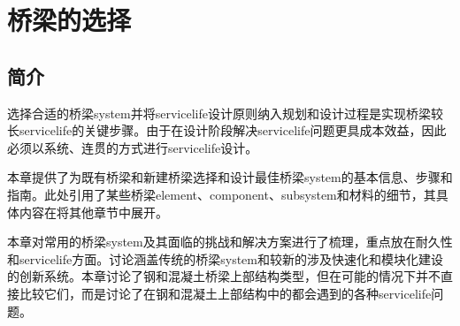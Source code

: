 \chapter{桥梁的选择}
\label{chp:bridge-system-selection}
\section{简介}
选择合适的桥梁\gls*{system}并将\gls*{servicelife}设计原则纳入规划和设计过程是实现桥梁较长\gls*{servicelife}的关键步骤。由于在设计阶段解决\gls*{servicelife}问题更具成本效益，因此必须以系统、连贯的方式进行\gls*{servicelife}设计。

本章提供了为既有桥梁和新建桥梁选择和设计最佳桥梁\gls*{system}的基本信息、步骤和指南。此处引用了某些桥梁\gls*{element}、\gls*{component}、\gls*{subsystem}和材料的细节，其具体内容在将其他章节中展开。

本章对常用的桥梁\gls*{system}及其面临的挑战和解决方案进行了梳理，重点放在耐久性和\gls*{servicelife}方面。讨论涵盖传统的桥梁\gls*{system}和较新的涉及快速化和模块化建设的创新系统。本章讨论了钢和混凝土桥梁上部结构类型，但在可能的情况下并不直接比较它们，而是讨论了在钢和混凝土上部结构中的都会遇到的各种\gls*{servicelife}问题。

